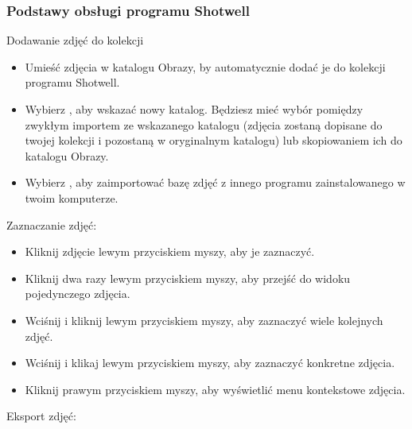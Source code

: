\subsubsection{Podstawy obsługi programu Shotwell}
Dodawanie zdjęć do kolekcji
\begin{itemize}
\item Umieść zdjęcia w katalogu Obrazy, by automatycznie dodać je do kolekcji programu Shotwell.
\item Wybierz , aby wskazać nowy katalog. Będziesz mieć wybór pomiędzy zwykłym importem ze wskazanego katalogu (zdjęcia zostaną dopisane do twojej kolekcji i pozostaną w oryginalnym katalogu) lub skopiowaniem ich do katalogu Obrazy.
\item Wybierz , aby zaimportować bazę zdjęć z innego programu zainstalowanego w twoim komputerze.
\end{itemize}
Zaznaczanie zdjęć:
\begin{itemize}
\item Kliknij zdjęcie lewym przyciskiem myszy, aby je zaznaczyć.
\item Kliknij dwa razy lewym przyciskiem myszy, aby przejść do widoku pojedynczego zdjęcia.
\item Wciśnij  i kliknij lewym przyciskiem myszy, aby zaznaczyć wiele kolejnych zdjęć.
\item Wciśnij  i klikaj lewym przyciskiem myszy, aby zaznaczyć konkretne zdjęcia.
\item Kliknij prawym przyciskiem myszy, aby wyświetlić menu kontekstowe zdjęcia.
\end{itemize}
Eksport zdjęć:

